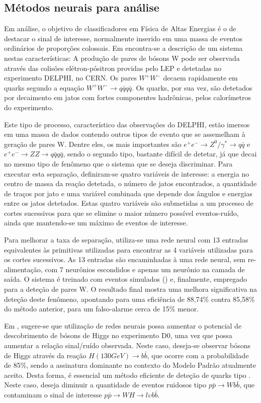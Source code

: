 \subsection{Métodos neurais para análise }

Em análise, o objetivo de classificadores em Física de Altas Energias é o de
destacar o sinal de interesse, normalmente inserido em uma massa de eventos
ordinários de proporções colossais. Em \cite{becks-acat-2001} encontra-se a
descrição de um sistema nestas características: A produção de pares de bósons
W pode ser observada através das colisões elétron-pósitron providas pelo LEP e
detetadas no experimento DELPHI, no CERN. Os pares $W^+W^-$ decaem rapidamente
em quarks segundo a equação $W^+W^- \rightarrow q\bar{q}q\bar{q}$. Os quarks,
por sua vez, são detetados por decaimento em jatos com fortes componentes
hadrônicas, pelos calorímetros do experimento.

Este tipo de processo, característico das observações do DELPHI, estão imersos
em uma massa de dados contendo outros tipos de evento que se assemelham à
geração de pares W. Dentre eles, os mais importantes são $e^+e^- \rightarrow
Z^0/\gamma^{*} \rightarrow q\bar{q}$ e $e^+e^- \rightarrow ZZ \rightarrow
q\bar{q}q\bar{q}$, sendo o segundo tipo, bastante difícil de detetar, já que
decai no mesmo tipo de fenômeno que o sistema que se deseja discriminar. Para
executar esta separação, definiram-se quatro variáveis de interesse: a energia
no centro de massa da reação detetada, o número de jatos encontrados, a
quantidade de traços por jato e uma variável combinada que depende dos ângulos
e energias entre os jatos detetados. Estas quatro variáveis são submetidas a
um processo de cortes sucessivos para que se elimine o maior número possível
eventos-ruído, ainda que mantendo-se um máximo de eventos de interesse.

Para melhorar a taxa de separação, utiliza-se uma rede neural com 13 entradas
equivalentes às primitivas utilizadas para encontrar as 4 variáveis utilizadas
para os cortes sucessivos. As 13 entradas são encaminhadas à uma rede neural,
sem re-alimentação, com 7 neurônios escondidos e apenas um neurônio na camada
de saída. O sistema é treinado com eventos simulados () e,
finalmente, empregado para a deteção de pares W. O resultado final mostra uma
melhora significativa na deteção deste fenômeno, apontando para uma eficiência
de 88,74\% contra 85,58\% do método anterior, para um falso-alarme cerca de
15\% menor.

Em \cite{tentindo-acat-2001}, sugere-se que utilização de redes neurais possa
aumentar o potencial de descobrimento de bósons de Higgs no experimento D0,
uma vez que possa aumentar a relação sinal/ruído observada. Neste caso,
deseja-se observar bósons de Higgs através da reação $H(130 GeV) \rightarrow
b\bar{b}$, que ocorre com a probabilidade de 85\%, sendo a assinatura
dominante no contexto do Modelo Padrão atualmente aceito. Desta forma, é
essencial um método eficiente de deteção de quarks tipo . Neste
caso, deseja diminuir a quantidade de eventos ruidosos tipo $p\bar{p}
\rightarrow Wb\bar{b}$, que contaminam o sinal de interesse $p\bar{p}
\rightarrow WH \rightarrow l \upsilon b\bar{b}$. 


